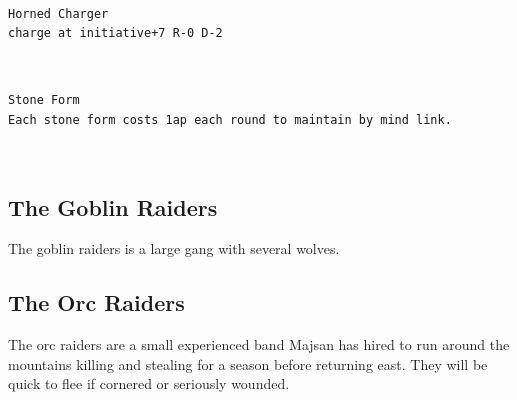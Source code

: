 \

\begin{samepage} \small \begin{verbatim}
Horned Charger
charge at initiative+7 R-0 D-2
\end{verbatim} \normalsize \end{samepage}

\

\begin{samepage} \small \begin{verbatim}
Stone Form
Each stone form costs 1ap each round to maintain by mind link.
\end{verbatim} \normalsize \end{samepage}

\






\subsection*{The Goblin Raiders}
\label{sec:goblinstats}

The goblin raiders is a large gang with several wolves.







\subsection*{The Orc Raiders}

The orc raiders are a small experienced band Majsan has hired to run around the mountains killing and stealing for a season before returning east. They will be quick to flee if cornered or seriously wounded.

